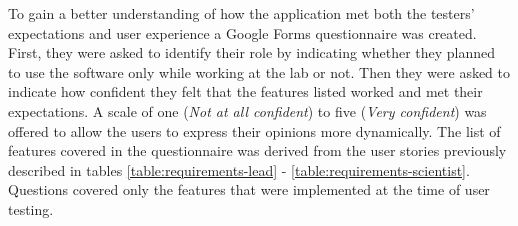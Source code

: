 To gain a better understanding of how the application met both the testers' expectations and user experience a Google Forms questionnaire was created. First, they were asked to identify their role by indicating whether they planned to use the software only while working at the lab or not. Then they were asked to indicate how confident they felt that the features listed worked and met their expectations. A scale of one (\emph{Not at all confident}) to five (\emph{Very confident}) was offered to allow the users to express their opinions more dynamically. The list of features covered in the questionnaire was derived from the user stories previously described in tables \ref{table:requirements-lead} - \ref{table:requirements-scientist}. Questions covered only the features that were implemented at the time of user testing.
